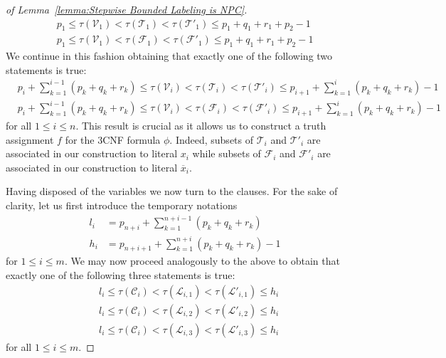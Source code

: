 \documentclass[a4paper,10pt]{llncs}
\begin{document}
\begin{proof}[of Lemma~\ref{lemma:Stepwise Bounded Labeling is NPC}]
\begin{align*}
    p_1 \leq \tau(\mathcal{V}_1) < \tau(\mathcal{T}_1) < \tau(\mathcal{T}'_1) \leq p_1 + q_1 + r_1 +p_2 - 1 \\
    p_1 \leq \tau(\mathcal{V}_1) < \tau(\mathcal{F}_1) < \tau(\mathcal{F}'_1) \leq p_1 + q_1 + r_1 +p_2 - 1
  \end{align*}
  We continue in this fashion obtaining that exactly one of the following two statements is true:
  \begin{align*}
    &p_i + \sum_{k=1}^{i-1} (p_k + q_k + r_k) \leq \tau(\mathcal{V}_i) < \tau(\mathcal{T}_i) < \tau(\mathcal{T}'_i) \leq p_{i+1} + \sum_{k=1}^{i} (p_k + q_k + r_k) - 1 \\
    &p_i + \sum_{k=1}^{i-1} (p_k + q_k + r_k) \leq \tau(\mathcal{V}_i) < \tau(\mathcal{F}_i) < \tau(\mathcal{F}'_i) \leq p_{i+1} + \sum_{k=1}^{i} (p_k + q_k + r_k) - 1 
  \end{align*}
  for all $1 \leq i \leq n$. This result is crucial as it allows us to construct a truth assignment $f$ for the $3$CNF formula $\phi$. Indeed, subsets of $\mathcal{T}_i$ and $\mathcal{T}'_i$ are associated in our construction to literal $x_i$ while subsets of $\mathcal{F}_i$ and $\mathcal{F}'_i$ are associated in our construction to literal $\overline{x}_i$.

  Having disposed of the variables we now turn to the clauses. For the sake of clarity, let us first introduce the temporary notations
  \begin{align*}
    l_i &= p_{n+i} + \sum_{k=1}^{n+i-1} (p_k + q_k + r_k) \\
    h_i  &= p_{n+i+1} + \sum_{k=1}^{n+i} (p_k + q_k + r_k) - 1
  \end{align*}
  for $1 \leq i \leq m$. We may now proceed analogously to the above to obtain that 
  exactly one of the following three statements is true:
  \begin{align*}
    &l_i \leq \tau(\mathcal{C}_i) < \tau(\mathcal{L}_{i, 1}) < \tau(\mathcal{L}'_{i, 1}) \leq h_i \\
    &l_i \leq \tau(\mathcal{C}_i) < \tau(\mathcal{L}_{i, 2}) < \tau(\mathcal{L}'_{i, 2}) \leq h_i \\
    &l_i \leq \tau(\mathcal{C}_i) < \tau(\mathcal{L}_{i, 3}) < \tau(\mathcal{L}'_{i, 3}) \leq h_i 
  \end{align*}
  for all $1 \leq i \leq m$. 


\end{proof}
\end{document}
